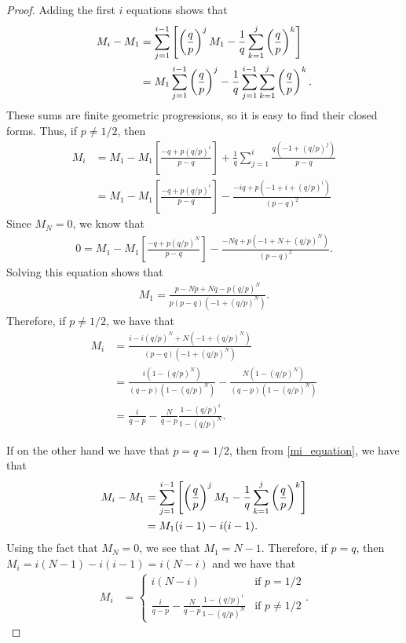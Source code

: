 \begin{proof}
  Adding the first $i$ equations shows that
  \begin{align}\label{mi_equation}
    M_{i} - M_1 &= \sum_{j=1}^{i-1} \left[\left(\frac{q}{p}\right)^j M_1 - \frac{1}{q}\sum_{k=1}^j \left(\frac{q}{p}\right)^k\right]\notag\\
    &= M_1 \sum_{j=1}^{i-1} \left(\frac{q}{p}\right)^j - \frac{1}{q}\sum_{j=1}^{i-1} \sum_{k=1}^j \left(\frac{q}{p}\right)^k.
  \end{align}
  These sums are finite geometric progressions, so it is easy to find their closed forms. Thus, if $p\neq 1/2$, then
  \begin{align*}
    M_{i} &=M_1 -M_1 \left[\frac{-q+p(q/p)^i}{p-q}\right] + \frac{1}{q}\sum_{j=1}^i\frac{q(-1 + (q/p)^j)}{p-q} \\
    &=M_1 -M_1 \left[\frac{-q+p(q/p)^i}{p-q}\right] - \frac{-iq + p(-1 + i + (q/p)^i)}{(p-q)^2}
  \end{align*}
  Since $M_N = 0$, we know that
  \begin{align*}
    0 = M_1 - M_1 \left[\frac{-q+p(q/p)^{N}}{p-q}\right] - \frac{-Nq + p(-1 + N + (q/p)^N)}{(p-q)^2}.
  \end{align*}
  Solving this equation shows that
  \begin{align*}
    M_1 = \frac{p - Np + Nq - p(q/p)^N}{p(p-q)(-1+(q/p)^N)}.
  \end{align*}
  Therefore, if $p\neq 1/2$, we have that
  \begin{align*}
    M_i &= \frac{i - i(q/p)^N + N(-1+(q/p)^N)}{(p-q)(-1+(q/p)^N)}\\
    &= \frac{i(1 - (q/p)^N)}{(q-p)(1-(q/p)^N)} - \frac{N(1-(q/p)^N)}{(q-p)(1-(q/p)^N)}\\
    &=\frac{i}{q-p} - \frac{N}{q-p}\frac{1-(q/p)^i}{1- (q/p)^N}.
  \end{align*}

  If on the other hand we have that $p = q = 1/2$, then from \eqref{mi_equation}, we have that
  \begin{align*}
    M_{i} - M_1 &= \sum_{j=1}^{i-1} \left[\left(\frac{q}{p}\right)^j M_1 - \frac{1}{q}\sum_{k=1}^j \left(\frac{q}{p}\right)^k\right]\notag\\
    &= M_1 (i-1) - i(i-1).
  \end{align*}
  Using the fact that $M_N = 0$, we see that $M_1 = N - 1$. Therefore, if $p=q$, then
  $M_i = i(N-1) - i(i-1)= i(N-i)$ and we have that
  \begin{align*}
    M_i &=
    \begin{cases}
      i(N-i) & \text{if $p = 1/2$} \\
      \displaystyle \frac{i}{q-p} - \frac{N}{q-p}\frac{1-(q/p)^i}{1- (q/p)^N} & \text{if $p \neq 1/2$}
    \end{cases}.
  \end{align*}
\end{proof}
\newpage
